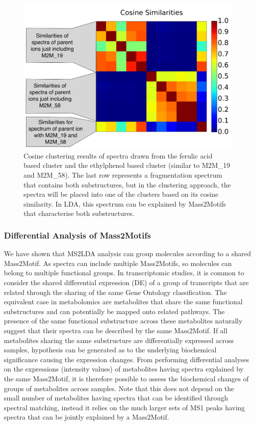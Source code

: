 \begin{figure}[!htbp]
\centering\includegraphics[width=0.6\linewidth]{07-lda/figures/figure10.pdf}
\centering\caption{Cosine clustering results of spectra drawn from the ferulic acid based cluster and the ethylphenol based cluster (similar to M2M_19 and M2M_58). The last row represents a fragmentation spectrum that contains both substructures, but in the clustering approach, the spectra will be placed into one of the clusters based on its cosine similarity. In LDA, this spectrum can be explained by Mass2Motifs that characterise both substructures.\label{fig:m2lda-cosine-clustering}}
\end{figure}

\subsubsection{Differential Analysis of Mass2Motifs}

We have shown that MS2LDA analysis can group molecules according to a shared Mass2Motif. As spectra can include multiple Mass2Motifs, so molecules can belong to multiple functional groups. In transcriptomic studies, it is common to consider the shared differential expression (DE) of a group of transcripts that are related through the sharing of the same Gene Ontology classification. The equivalent case in metabolomics are metabolites that share the same functional substructures and can potentially be mapped onto related pathways. The presence of the same functional substructure across these metabolites naturally suggest that their spectra can be described by the same Mass2Motif. If all metabolites sharing the same substructure are differentially expressed across samples, hypothesis can be generated as to the underlying biochemical significance causing the expression changes. From performing differential analyses on the expressions (intensity values) of metabolites having spectra explained by the same Mass2Motif, it is therefore possible to assess the biochemical changes of groups of metabolites across samples. Note that this does not depend on the small number of metabolites having spectra that can be identified through spectral matching, instead it relies on the much larger sets of MS1 peaks having spectra that can be jointly explained by a Mass2Motif.

